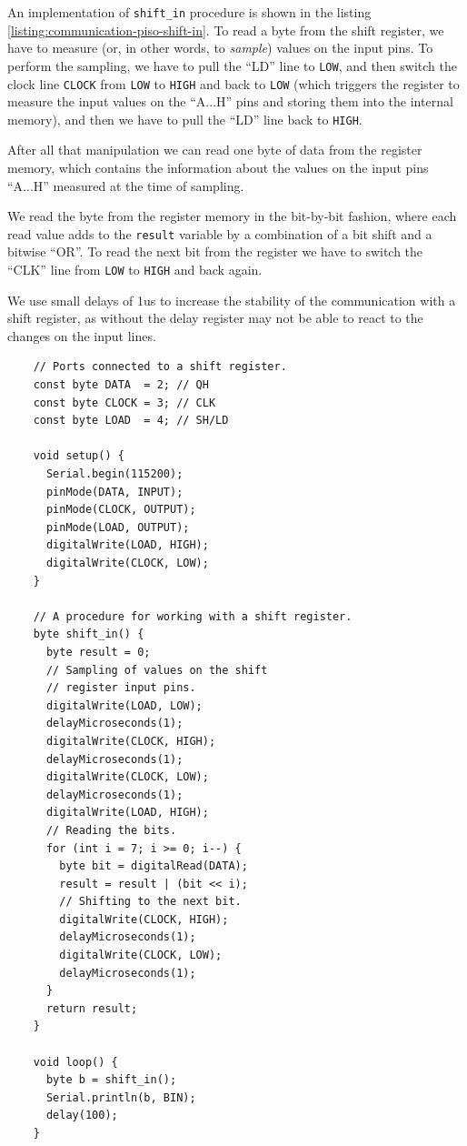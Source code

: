 \documentclass[../sparc.tex]{subfiles}
\begin{document}
An implementation of \texttt{shift_in} procedure is shown in the
listing \ref{listing:communication-piso-shift-in}.  To read a byte from the
shift register, we have to measure (or, in other words, to \emph{sample}) values
on the input pins.  To perform the sampling, we have to pull the ``LD'' line to
\texttt{LOW}, and then switch the clock line \texttt{CLOCK} from \texttt{LOW} to
\texttt{HIGH} and back to \texttt{LOW} (which triggers the register to measure
the input values on the ``A...H'' pins and storing them into the internal
memory), and then we have to pull the ``LD'' line back to \texttt{HIGH}.

After all that manipulation we can read one byte of data from the register
memory, which contains the information about the values on the input pins
``A...H'' measured at the time of sampling.

We read the byte from the register memory in the bit-by-bit fashion, where each
read value adds to the \texttt{result} variable by a combination of a
bit shift and a bitwise ``OR''.  To read the next bit from the register we have
to switch the ``CLK'' line from \texttt{LOW} to \texttt{HIGH} and back again.

We use small delays of 1us to increase the stability of the communication with a
shift register, as without the delay register may not be able to react to the
changes on the input lines.

\begin{listing}[H]
  \begin{verbatim}
    // Ports connected to a shift register.
    const byte DATA  = 2; // QH
    const byte CLOCK = 3; // CLK
    const byte LOAD  = 4; // SH/LD

    void setup() {
      Serial.begin(115200);
      pinMode(DATA, INPUT);
      pinMode(CLOCK, OUTPUT);
      pinMode(LOAD, OUTPUT);
      digitalWrite(LOAD, HIGH);
      digitalWrite(CLOCK, LOW);
    }

    // A procedure for working with a shift register.
    byte shift_in() {
      byte result = 0;
      // Sampling of values on the shift
      // register input pins.
      digitalWrite(LOAD, LOW);
      delayMicroseconds(1);
      digitalWrite(CLOCK, HIGH);
      delayMicroseconds(1);
      digitalWrite(CLOCK, LOW);
      delayMicroseconds(1);
      digitalWrite(LOAD, HIGH);
      // Reading the bits.
      for (int i = 7; i >= 0; i--) {
        byte bit = digitalRead(DATA);
        result = result | (bit << i);
        // Shifting to the next bit.
        digitalWrite(CLOCK, HIGH);
        delayMicroseconds(1);
        digitalWrite(CLOCK, LOW);
        delayMicroseconds(1);
      }
      return result;
    }

    void loop() {
      byte b = shift_in();
      Serial.println(b, BIN);
      delay(100);
    }
  \end{verbatim}
  \label{listing:communication-piso-shift-in}
  \caption{A procedure for the sequential reading of the byte from the shift
    register.}
\end{listing}
\end{document}
